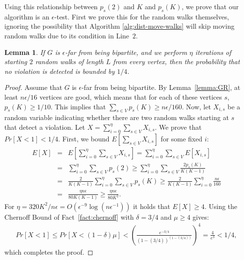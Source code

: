 \documentclass[11pt]{article}
\newtheorem{lemma}[theorem]{Lemma}
\begin{document}
Using this relationship between $p_s(2)$ and $K$ and $p_s(K)$, we prove that our algorithm is an
$\epsilon$-test. First we prove this for the random walks themselves, ignoring the possibility that
Algorithm \ref{alg:dist-move-walks} will skip moving random walks due to its condition in Line~$2$.

\begin{lemma}\label{lem:walks-detect}
If $G$ is $\epsilon$-far from being bipartite, and we perform $\eta$ iterations of starting $2$ random walks of length $L$ from every vertex, then the probability that no violation is detected is bounded by $1/4$.
\end{lemma}


\begin{proof}
Assume that $G$ is $\epsilon$-far from being bipartite. By Lemma~\ref{lemma:GR}, at least $n\epsilon/16$ vertices are good, which means that for each of these vertices $s$, $p_s(K) \geq 1/10$. This implies that $\sum_{s \in V} p_s(K) \geq n \epsilon/160$.
Now, let $X_{i,s}$ be a random variable indicating whether there are two random walks starting at $s$ that detect a violation. Let $X=\sum_{i=0}^{\eta}\sum_{s \in V}X_{i,s}$. We prove that $Pr[X<1] < 1/4$. First, we bound $E[\sum_{s \in V}X_{i,s}]$ for some fixed $i$:
\begin{eqnarray*}
E[X] &=& E\left[\sum_{i=0}^{\eta}\sum_{s \in V}X_{i,s}\right] = \sum_{i=0}^{\eta}\sum_{s \in V}E[X_{i,s}] \\
&=& \sum_{i=0}^{\eta}\sum_{s \in V}{p_s(2)} \geq \sum_{i=0}^{\eta}\sum_{s \in V}{\frac{2p_s(K)}{K(K-1)}} \\
&=& {\frac{2}{K(K-1)}}\sum_{i=0}^{\eta}\sum_{s \in V}{p_s(K)} \geq {\frac{2}{K(K-1)}}\sum_{i=0}^{\eta}\frac{n\epsilon}{160}\\
&=& \frac{\eta n \epsilon}{80K(K-1)} \geq \frac{\eta n \epsilon}{80K^2}.
\end{eqnarray*}
For $\eta = 320K^2/ n\epsilon = O(\epsilon^{-9} \log(n \epsilon^{-1}))$ it holds that $E[X] \geq 4$.
Using the Chernoff Bound of Fact~\ref{fact:chernoff} with $\delta=3/4$ and $\mu \geq 4$ gives:
\begin{align*}
Pr[X < 1] \leq Pr[X < (1-\delta)\mu] < (\frac{e^{-3/4}}{(1-(3/4))^{(1-(3/4))}})^{4} = \frac{4}{e^3} < 1/4,
\end{align*}
which completes the proof.
\end{proof}
\end{document}

